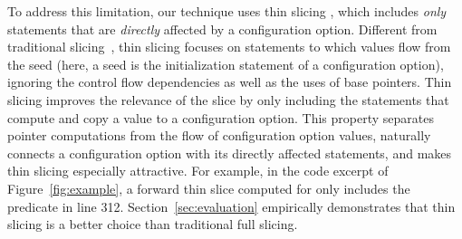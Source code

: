 

To address this limitation, our technique uses thin
slicing \cite{Sridharan:2007}, which includes
\textit{only} statements that are \textit{directly} affected by a configuration option.
Different from traditional slicing~\cite{Horwitz:1988}, thin slicing
focuses on statements to which values flow from the seed (here, a
seed is the initialization statement of a configuration option), ignoring the 
control flow dependencies as well as the uses of
base pointers. Thin slicing improves the relevance
of the slice by only including the statements that compute
and copy a value to a configuration option.
This property separates
pointer computations from the flow of configuration option values,
naturally connects a configuration option with its
directly affected statements, and makes thin slicing
especially attractive.
For example, in the code excerpt of
Figure~\ref{fig:example},
a forward thin slice computed for 
only includes the predicate in line 312.
Section~\ref{sec:evaluation} 
empirically demonstrates that thin slicing
is a better choice than traditional full slicing.




% 

